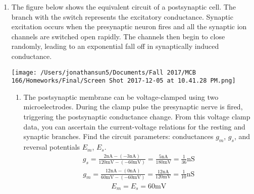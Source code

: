 \documentclass[11pt]{article}
\begin{document}
\begin{enumerate}[label=\arabic*.]
\newpage
\item
The figure below shows the equivalent circuit of a postsynaptic cell. The branch with the switch represents the excitatory conductance. Synaptic excitation occurs when the presynaptic neuron fires and all the synaptic ion channels are switched open rapidly. The channels then begin to close randomly, leading to an exponential fall off in synaptically induced conductance.
\begin{center}
\texttt{[image: /Users/jonathansun5/Documents/Fall 2017/MCB 166/Homeworks/Final/Screen Shot 2017-12-05 at 10.41.28 PM.png]}
\end{center}
\begin{enumerate}[label=(\alph*)]
\item
The postsynaptic membrane can be voltage-clamped using two microelectrodes. During the clamp pulse the presynaptic nerve is fired, triggering the postsynaptic conductance change. From this voltage clamp data, you can ascertain the current-voltage relations for the resting and synaptic branches. Find the circuit parameters: conductances $g_m$, $g_s$, and reversal potentials $E_m$, $E_s$.
\begin{align*}
g_s = \frac{2 \text{nA} - (-3 \text{nA})} {120 \text{mV} - (-60 \text{mV})} = \frac{5 \text{nA}} {180 \text{mV}} = \frac{1} {36} \text{nS}
\end{align*}
\begin{align*}
g_m = \frac{12 \text{nA} - (0 \text{nA})} {60 \text{mV} - (-60 \text{mV})} = \frac{12 \text{nA}} {120 \text{mV}} = \frac{1} {10} \text{nS}
\end{align*}
\begin{align*}
E_m = E_s = 60 \text{mV}
\end{align*}




\end{enumerate}
\end{enumerate}
\end{document}
